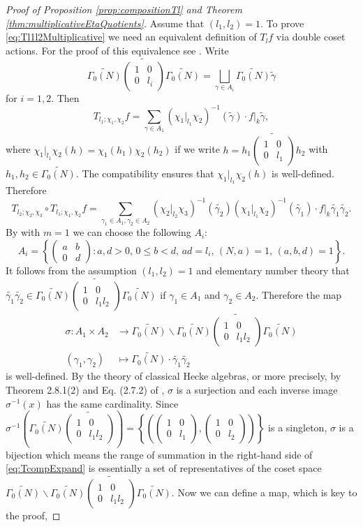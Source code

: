 \documentclass[12pt]{amsart}
\numberwithin{equation}{section}
\theoremstyle{plain}
\theoremstyle{definition}
\theoremstyle{remark}
\newcommand\tbtmat[4]{\left(\begin{smallmatrix}{#1} & {#2} \\ {#3} & {#4}\end{smallmatrix}\right)}
\begin{document}
\begin{proof}[Proof of Proposition \ref{prop:compositionTl} and Theorem \ref{thm:multiplicativeEtaQuotients}]
Assume that $(l_1,l_2)=1$. To prove \eqref{eq:Tl1l2Multiplicative} we need an equivalent definition of $T_lf$ via double coset actions. For the proof of this equivalence see \cite[Eq. (28) and (30)]{ZZ23}. Write
\begin{equation*}
\widetilde{\Gamma_0(N)}\widetilde{\tbtmat{1}{0}{0}{l_i}}\widetilde{\Gamma_0(N)}=\bigsqcup_{\gamma\in A_i}\widetilde{\Gamma_0(N)}\widetilde{\gamma}
\end{equation*}
for $i=1,2$. Then
$$
T_{l_1;\chi_1,\chi_2}f=\sum_{\gamma\in A_1}(\chi_1\vert_{l_1}\chi_2)^{-1}(\widetilde{\gamma})\cdot f\vert_k\widetilde{\gamma},
$$
where $\chi_1\vert_{l_1}\chi_2(h)=\chi_1(h_1)\chi_2(h_2)$ if we write $h=h_1\widetilde{\tbtmat{1}{0}{0}{l_1}}h_2$ with $h_1,h_2\in\widetilde{\Gamma_0(N)}$. The compatibility ensures that $\chi_1\vert_{l_1}\chi_2(h)$ is well-defined. Therefore
\begin{equation}
\label{eq:TcompExpand}
T_{l_2;\chi_2,\chi_3}\circ T_{l_1;\chi_1,\chi_2}f=\sum_{\gamma_1\in A_1,\gamma_2\in A_2}(\chi_2\vert_{l_2}\chi_3)^{-1}(\widetilde{\gamma_2})(\chi_1\vert_{l_1}\chi_2)^{-1}(\widetilde{\gamma_1})\cdot f\vert_k\widetilde{\gamma_1}\widetilde{\gamma_2}.
\end{equation}
By \cite[Eq. (25)]{ZZ23} with $m=1$ we can choose the following $A_i$:
\begin{equation}
\label{eq:Airepr}
A_i=\left\{\tbtmat{a}{b}{0}{d}\colon a,d>0,\,0\leq b<d,\,ad=l_i,\,(N,a)=1,\,(a,b,d)=1\right\}.
\end{equation}
It follows from the assumption $(l_1,l_2)=1$ and elementary number theory that $\widetilde{\gamma_1}\widetilde{\gamma_2}\in\widetilde{\Gamma_0(N)}\widetilde{\tbtmat{1}{0}{0}{l_1l_2}}\widetilde{\Gamma_0(N)}$ if $\gamma_1\in A_1$ and $\gamma_2\in A_2$. Therefore the map
\begin{align*}
\sigma\colon A_1\times A_2&\rightarrow\widetilde{\Gamma_0(N)}\backslash\widetilde{\Gamma_0(N)}\widetilde{\tbtmat{1}{0}{0}{l_1l_2}}\widetilde{\Gamma_0(N)}\\
(\gamma_1,\gamma_2) &\mapsto \widetilde{\Gamma_0(N)}\cdot\widetilde{\gamma_1}\widetilde{\gamma_2}
\end{align*}
is well-defined. By the theory of classical Hecke algebras, or more precisely, by Theorem 2.8.1(2) and Eq. (2.7.2) of \cite{Miy06}, $\sigma$ is a surjection and each inverse image $\sigma^{-1}(x)$ has the same cardinality. Since $\sigma^{-1}\left(\widetilde{\Gamma_0(N)}\widetilde{\tbtmat{1}{0}{0}{l_1l_2}}\right)=\left\{(\tbtmat{1}{0}{0}{l_1},\tbtmat{1}{0}{0}{l_2})\right\}$ is a singleton, $\sigma$ is a bijection which means the range of summation in the right-hand side of \eqref{eq:TcompExpand} is essentially a set of representatives of the coset space $\widetilde{\Gamma_0(N)}\backslash\widetilde{\Gamma_0(N)}\widetilde{\tbtmat{1}{0}{0}{l_1l_2}}\widetilde{\Gamma_0(N)}$. Now we can define a map, which is key to the proof,

\end{proof}
\end{document}
